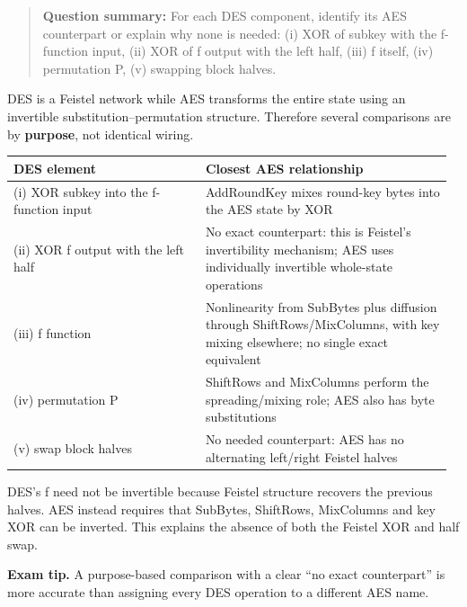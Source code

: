 \documentclass[11pt,a4paper]{article}
\begin{document}
\begin{quote}\small

\textbf{Question summary:} For each DES component,\allowbreak{} identify its AES counterpart or explain why none is needed: (i) XOR of subkey with the f-function input,\allowbreak{} (ii) XOR of f output with the left half,\allowbreak{} (iii) f itself,\allowbreak{} (iv) permutation P,\allowbreak{} (v) swapping block halves.



\end{quote}

DES is a Feistel network while AES transforms the entire state using an invertible substitution–permutation structure. Therefore several comparisons are by \textbf{purpose},\allowbreak{} not identical wiring.



{\small\setlength{\tabcolsep}{3pt}
\begin{longtable}{>{\raggedright\arraybackslash}p{0.42681\linewidth}>{\raggedright\arraybackslash}p{0.54408\linewidth}}
\toprule
\textbf{DES element} & \textbf{Closest AES relationship} \\
\midrule
\endhead
(i) XOR subkey into the f-function input & AddRoundKey mixes round-key bytes into the AES state by XOR \\
(ii) XOR f output with the left half & No exact counterpart: this is Feistel’s invertibility mechanism; AES uses individually invertible whole-state operations \\
(iii) f function & Nonlinearity from SubBytes plus diffusion through ShiftRows/\allowbreak{}MixColumns,\allowbreak{} with key mixing elsewhere; no single exact equivalent \\
(iv) permutation P & ShiftRows and MixColumns perform the spreading/\allowbreak{}mixing role; AES also has byte substitutions \\
(v) swap block halves & No needed counterpart: AES has no alternating left/\allowbreak{}right Feistel halves \\
\bottomrule
\end{longtable}
}

DES’s f need not be invertible because Feistel structure recovers the previous halves. AES instead requires that SubBytes,\allowbreak{} ShiftRows,\allowbreak{} MixColumns and key XOR can be inverted. This explains the absence of both the Feistel XOR and half swap.



{\color{ForestGreen}\textbf{Exam tip.} A purpose-based comparison with a clear “no exact counterpart” is more accurate than assigning every DES operation to a different AES name.}
\end{document}
